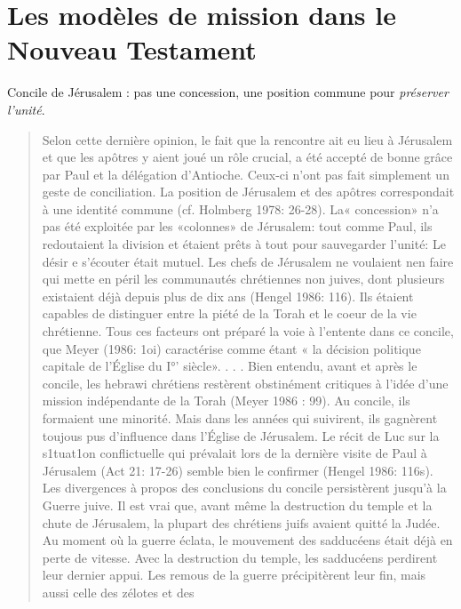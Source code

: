 \chapter{Les modèles de mission dans le Nouveau Testament}


\begin{Synthesis}
Concile de Jérusalem : pas une concession, une position commune pour \textit{préserver l'unité}.
\end{Synthesis}

\begin{quote}
 Selon cette dernière opinion, le fait que la rencontre ait
eu lieu à Jérusalem et que les apôtres y aient joué un rôle crucial, a été
accepté de bonne grâce par Paul et la délégation d'Antioche. Ceux-ci
n'ont pas fait simplement un geste de conciliation. La position de
Jérusalem et des apôtres correspondait à une identité commune (cf.
Holmberg 1978: 26-28). La« concession» n'a pas été exploitée par
les «colonnes» de Jérusalem: tout comme Paul, ils redoutaient la
division et étaient prêts à tout pour sauvegarder l'unité: Le désir e
s'écouter était mutuel. Les chefs de Jérusalem ne voulaient nen faire
qui mette en péril les communautés chrétiennes non juives, dont
plusieurs existaient déjà depuis plus de dix ans (Hengel 1986: 116).
Ils étaient capables de distinguer entre la piété de la Torah et le coeur
de la vie chrétienne. Tous ces facteurs ont préparé la voie à l'entente
dans ce concile, que Meyer (1986: 1oi) caractérise comme étant « la
décision politique capitale de l'Église du I°'  siècle». . . .
Bien entendu, avant et après le concile, les hebrawi chrétiens
restèrent obstinément critiques à l'idée d'une mission indépendante de
la Torah (Meyer 1986 : 99). Au concile, ils formaient une minorité.
Mais dans les années qui suivirent, ils gagnèrent toujous pus
d'influence dans l'Église de Jérusalem. Le récit de Luc sur la s1tuat1on
conflictuelle qui prévalait lors de la dernière visite de Paul à Jérusalem
(Act 21: 17-26) semble bien le confirmer (Hengel 1986: 116s).
Les divergences à propos des conclusions du concile persistèrent
jusqu'à la Guerre juive. Il est vrai que, avant même la destruction du
temple et la chute de Jérusalem, la plupart des chrétiens juifs avaient
quitté la Judée. Au moment où la guerre éclata, le mouvement des
sadducéens était déjà en perte de vitesse. Avec la destruction du
temple, les sadducéens perdirent leur dernier appui. Les remous de la
guerre précipitèrent leur fin, mais aussi celle des zélotes et des

\end{quote}

